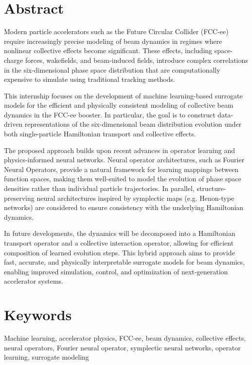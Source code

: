 \documentclass[11pt,a4paper]{article}
\begin{document}
\begin{sloppypar}
\section*{Abstract}

Modern particle accelerators such as the Future Circular Collider (FCC-ee) require increasingly precise modeling of beam dynamics in regimes where nonlinear collective effects become significant. These effects, including space-charge forces, wakefields, and beam-induced fields, introduce complex correlations in the six-dimensional phase space distribution that are computationally expensive to simulate using traditional tracking methods.

This internship focuses on the development of machine learning-based surrogate models for the efficient and physically consistent modeling of collective beam dynamics in the FCC-ee booster. In particular, the goal is to construct data-driven representations of the six-dimensional beam distribution evolution under both single-particle Hamiltonian transport and collective effects.

The proposed approach builds upon recent advances in operator learning and physics-informed neural networks. Neural operator architectures, such as Fourier Neural Operators, provide a natural framework for learning mappings between function spaces, making them well-suited to model the evolution of phase space densities rather than individual particle trajectories. In parallel, structure-preserving neural architectures inspired by symplectic maps (e.g. Henon-type networks) are considered to ensure consistency with the underlying Hamiltonian dynamics.

In future developments, the dynamics will be decomposed into a Hamiltonian transport operator and a collective interaction operator, allowing for efficient composition of learned evolution steps. This hybrid approach aims to provide fast, accurate, and physically interpretable surrogate models for beam dynamics, enabling improved simulation, control, and optimization of next-generation accelerator systems.

\section*{Keywords}

Machine learning, accelerator physics, FCC-ee, beam dynamics, collective effects, neural operators, Fourier neural operator, symplectic neural networks, operator learning, surrogate modeling
\label{conclusion}





\end{sloppypar}
\end{document}
